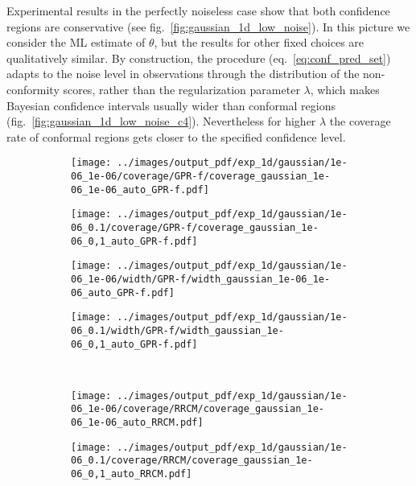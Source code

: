 \documentclass[conference]{IEEEtran}
\begin{document}
Experimental results in the perfectly noiseless case show that both confidence regions
are conservative (see fig.~\ref{fig:gaussian_1d_low_noise}). In this picture we consider
the ML estimate of $\theta$, but the results for other fixed choices are qualitatively
similar. By construction, the procedure (eq.~\ref{eq:conf_pred_set}) adapts to the noise
level in observations through the distribution of the non-conformity scores, rather
than the regularization parameter $\lambda$, which makes Bayesian confidence intervals
usually wider than conformal regions (fig.~\ref{fig:gaussian_1d_low_noise_c4}). Nevertheless
for higher $\lambda$ the coverage rate of conformal regions gets closer to the specified
confidence level.

\begin{figure}%
  \centering
  \begin{subfigure}[b]{0.25\linewidth}
    \texttt{[image: ../images/output\_pdf/exp\_1d/gaussian/1e-06\_1e-06/coverage/GPR-f/coverage\_gaussian\_1e-06\_1e-06\_auto\_GPR-f.pdf]}
  \end{subfigure}%
  \begin{subfigure}[b]{0.25\linewidth}
    \texttt{[image: ../images/output\_pdf/exp\_1d/gaussian/1e-06\_0.1/coverage/GPR-f/coverage\_gaussian\_1e-06\_0,1\_auto\_GPR-f.pdf]}
  \end{subfigure}%
  \begin{subfigure}[b]{0.25\linewidth}
    \texttt{[image: ../images/output\_pdf/exp\_1d/gaussian/1e-06\_1e-06/width/GPR-f/width\_gaussian\_1e-06\_1e-06\_auto\_GPR-f.pdf]}
  \end{subfigure}%
  \begin{subfigure}[b]{0.25\linewidth}
    \texttt{[image: ../images/output\_pdf/exp\_1d/gaussian/1e-06\_0.1/width/GPR-f/width\_gaussian\_1e-06\_0,1\_auto\_GPR-f.pdf]}
  \end{subfigure}\\
  \begin{subfigure}[b]{0.25\linewidth}
    \texttt{[image: ../images/output\_pdf/exp\_1d/gaussian/1e-06\_1e-06/coverage/RRCM/coverage\_gaussian\_1e-06\_1e-06\_auto\_RRCM.pdf]}
  \end{subfigure}%
  \begin{subfigure}[b]{0.25\linewidth}
    \texttt{[image: ../images/output\_pdf/exp\_1d/gaussian/1e-06\_0.1/coverage/RRCM/coverage\_gaussian\_1e-06\_0,1\_auto\_RRCM.pdf]}
  \end{subfigure}%

\end{figure}
\end{document}

